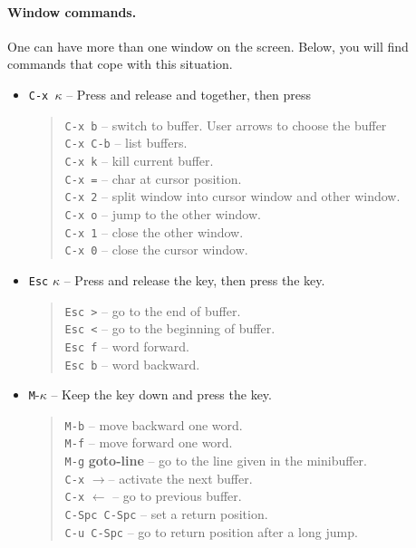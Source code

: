 \documentclass[a4paper,12pt]{book}
\begin{document}
\paragraph{Window commands.} One can have more
than one window on the screen. Below, you will
find commands that cope with this situation.
\begin{itemize}
\item \verb|C-x |$\kappa$ -- Press and release 
and  together, then press \keys{$\kappa$} 
\begin{quote}
\verb|C-x b| -- switch to buffer. User arrows to choose the buffer\\
\verb|C-x C-b| -- list buffers.\\
\verb|C-x k| -- kill current buffer.\\
\verb|C-x =| -- char at cursor position.\\
\verb|C-x 2| -- split window into cursor window and other window.\\
\verb|C-x o| -- jump to the other window.\\
\verb|C-x 1| -- close the other window.\\
\verb|C-x 0| -- close the cursor window.
\end{quote}
\item \verb|Esc| $\kappa$ -- Press and release the  key,
then press the \keys{$\kappa$} key.
\begin{quote}
\verb|Esc >| -- go to the end of buffer.\\
\verb|Esc <| -- go to the beginning of buffer.\\ 
\verb|Esc f| -- word forward.\\
\verb|Esc b| -- word backward.\\
\end{quote}
\item \verb|M|-$\kappa$ -- Keep the  key
down and press the \keys{$\kappa$} key.
\begin{quote}
\verb|M-b| -- move backward one word.\\
\verb|M-f| -- move forward one word.\\
\verb|M-g| {\bf goto-line} -- go to the line given in the minibuffer.\\
\verb|C-x| $\rightarrow$-- activate the next buffer.\\
\verb|C-x| $\leftarrow$ -- go to previous buffer.\\
\verb|C-Spc C-Spc| -- set a return position.\\
\verb|C-u C-Spc| -- go to return position after a long jump.
\end{quote}
\end{itemize}
\end{document}

